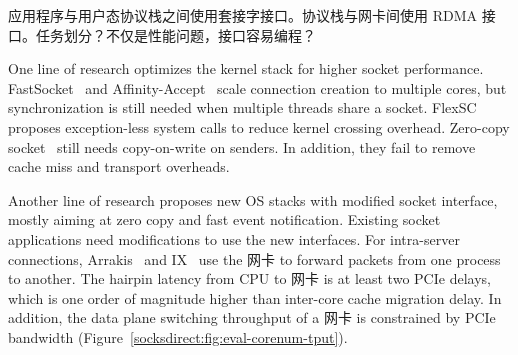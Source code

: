 应用程序与用户态协议栈之间使用套接字接口。协议栈与网卡间使用 RDMA 接口。任务划分？不仅是性能问题，接口容易编程？










\iffalse
{}
One line of research optimizes the kernel stack for higher socket performance. FastSocket~\cite{lin2016scalable} and Affinity-Accept~\cite{pesterev2012improving} scale connection creation to multiple cores, but synchronization is still needed when multiple threads share a socket.
FlexSC~\cite{soares2010flexsc} proposes exception-less system calls to reduce kernel crossing overhead.
Zero-copy socket~\cite{thadani1995efficient,chu1996zero} still needs copy-on-write on senders.
In addition, they fail to remove cache miss and transport overheads.


Another line of research proposes new OS stacks with modified socket interface, mostly aiming at zero copy and fast event notification. Existing socket applications need modifications to use the new interfaces.
For intra-server connections, Arrakis~\cite{peter2016arrakis} and IX~\cite{belay2017ix} use the 网卡 to forward packets from one process to another. The hairpin latency from CPU to 网卡 is at least two PCIe delays, which is one order of magnitude higher than inter-core cache migration delay. In addition, the data plane switching throughput of a 网卡 is constrained by PCIe bandwidth (Figure~\ref{socksdirect:fig:eval-corenum-tput}).

